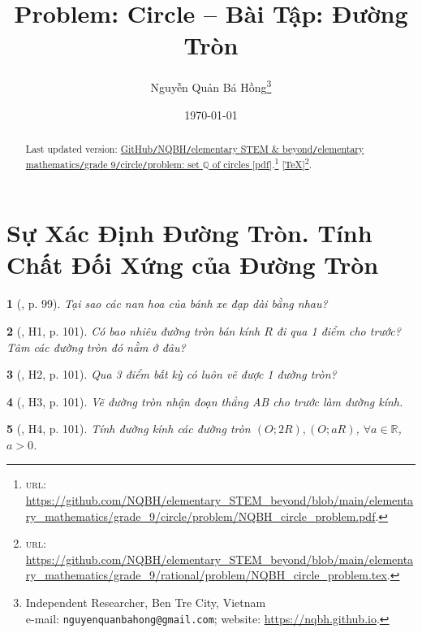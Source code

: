 \documentclass{article}
\title{Problem: Circle -- Bài Tập: Đường Tròn}
\author{Nguyễn Quản Bá Hồng\footnote{Independent Researcher, Ben Tre City, Vietnam\\e-mail: \texttt{nguyenquanbahong@gmail.com}; website: \url{https://nqbh.github.io}.}}
\date{\today}
\newtheorem{baitoan}{}
\begin{document}
\maketitle
\begin{abstract}
	Last updated version: \href{https://github.com/NQBH/elementary_STEM_beyond/blob/main/elementary_mathematics/grade_9/circle/problem/NQBH_circle_problem.pdf}{GitHub{\tt/}NQBH{\tt/}elementary STEM \& beyond{\tt/}elementary mathematics{\tt/}grade 9{\tt/}circle{\tt/}problem: set $\mathbb{Q}$ of circles [pdf]}.\footnote{\textsc{url}: \url{https://github.com/NQBH/elementary_STEM_beyond/blob/main/elementary_mathematics/grade_9/circle/problem/NQBH_circle_problem.pdf}.} [\href{https://github.com/NQBH/elementary_STEM_beyond/blob/main/elementary_mathematics/grade_9/circle/problem/NQBH_circle_problem.tex}{\TeX}]\footnote{\textsc{url}: \url{https://github.com/NQBH/elementary_STEM_beyond/blob/main/elementary_mathematics/grade_9/rational/problem/NQBH_circle_problem.tex}.}. 
\end{abstract}
\tableofcontents


\section{Sự Xác Định Đường Tròn. Tính Chất Đối Xứng của Đường Tròn}

\begin{baitoan}[\cite{Binh_boi_duong_Toan_9_tap_1}, p. 99]
	Tại sao các nan hoa của bánh xe đạp dài bằng nhau?
\end{baitoan}

\begin{baitoan}[\cite{Binh_boi_duong_Toan_9_tap_1}, H1, p. 101]
	Có bao nhiêu đường tròn bán kính $R$ đi qua 1 điểm cho trước? Tâm các đường tròn đó nằm ở đâu?
\end{baitoan}

\begin{baitoan}[\cite{Binh_boi_duong_Toan_9_tap_1}, H2, p. 101]
	Qua 3 điểm bất kỳ có luôn vẽ được 1 đường tròn?
\end{baitoan}

\begin{baitoan}[\cite{Binh_boi_duong_Toan_9_tap_1}, H3, p. 101]
	Vẽ đường tròn nhận đoạn thẳng AB cho trước làm đường kính.
\end{baitoan}

\begin{baitoan}[\cite{Binh_boi_duong_Toan_9_tap_1}, H4, p. 101]
	Tính đường kính các đường tròn $(O;2R),(O;aR)$, $\forall a\in\mathbb{R}$, $a > 0$.
\end{baitoan}
\end{document}
